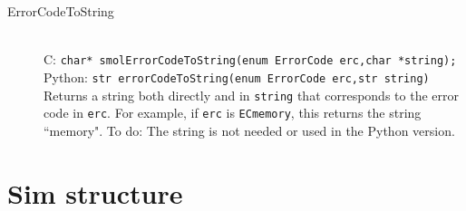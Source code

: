 \documentclass {book}
\begin{document}
\begin{description}
\item[ErrorCodeToString]
\hfill \\
C: \texttt{char* smolErrorCodeToString(enum ErrorCode erc,char *string);}\\
Python: \texttt{str errorCodeToString(enum ErrorCode erc,str string)}\\
Returns a string both directly and in \texttt{string} that corresponds to the error code in \texttt{erc}. For example, if \texttt{erc} is \texttt{ECmemory}, this returns the string ``memory". To do: The string is not needed or used in the Python version.

\end{description}

\section{Sim structure}
\end{document}
